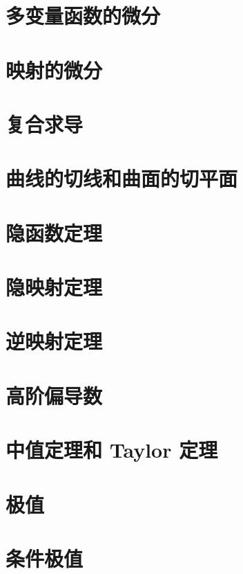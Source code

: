 \documentclass[a4paper, 11pt]{ctexbook}
\begin{document}
        \section{多变量函数的微分}
            
        \section{映射的微分}
            
        \section{复合求导}
        \section{曲线的切线和曲面的切平面}
        \section{隐函数定理}
        \section{隐映射定理}
        \section{逆映射定理}
        \section{高阶偏导数}
        \section{中值定理和 Taylor 定理}
        \section{极值}
        \section{条件极值}
\end{document}
